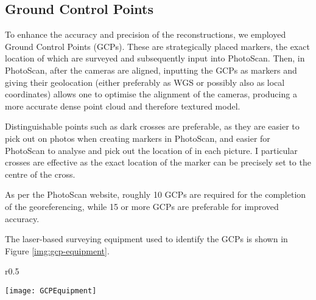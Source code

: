 \subsection{Ground Control Points}

To enhance the accuracy and precision of the reconstructions, we employed Ground
Control Points (GCPs). These are strategically placed markers, the exact
location of which are surveyed and subsequently input into PhotoScan. Then, in
PhotoScan, after the cameras are aligned, inputting the GCPs as markers and
giving their geolocation (either preferably as WGS or possibly also as local
coordinates) allows one to optimise the alignment of the cameras, producing a
more accurate dense point cloud and therefore textured model.

Distinguishable points such as dark crosses are preferable, as they are easier
to pick out on photos when creating markers in PhotoScan, and easier for
PhotoScan to analyse and pick out the location of in each picture. I particular
crosses are effective as the exact location of the marker can be precisely set
to the centre of the cross.

As per the PhotoScan
website,
roughly 10 GCPs are required for the completion of the georeferencing, while 15
or more GCPs are preferable for improved accuracy.

The laser-based surveying equipment used to identify the GCPs is shown in Figure
\ref{img:gcp-equipment}.

\begin{wrapfigure}{r}{0.5\textwidth}
    \begin{center}
        \texttt{[image: GCPEquipment]}
        \caption{The equipment used to survey in Ground Control Points.}
        \label{img:gcp-equipment}
    \end{center}
\end{wrapfigure}
